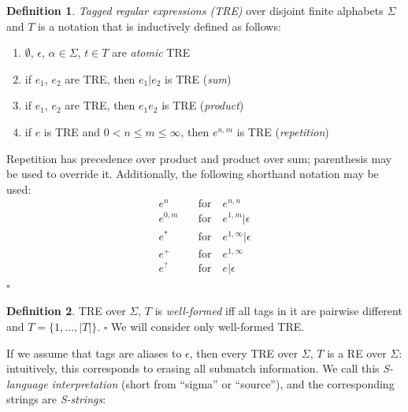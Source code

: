 \documentclass{article}
\newcommand{\Xin}{\!\in\!}
\newcommand{\Xeq}{\!=\!}
\theoremstyle{definition}
\newtheorem{Xdef}{Definition}
\begin{document}
\begin{multicols}{2}
    \begin{Xdef}
    \emph{Tagged regular expressions (TRE)} over disjoint finite alphabets $\Sigma$ and $T$
    is a notation that is inductively defined as follows:
    \begin{enumerate}
        \medskip
        \item[] $\emptyset$, $\epsilon$, $\alpha \Xin \Sigma$, $t \Xin T$ are \emph{atomic} TRE
        \item[] if $e_1$, $e_2$ are TRE, then $e_1 | e_2$ is TRE (\emph{sum})
        \item[] if $e_1$, $e_2$ are TRE, then $e_1 e_2$ is TRE (\emph{product})
        \item[] if $e$ is TRE and $0 \!<\! n \!\leq\! m \!\leq\! \infty$, then $e^{n,m}$ is TRE (\emph{repetition})
        \medskip
    \end{enumerate}
    Repetition has precedence over product and product over sum;
    parenthesis may be used to override it.
    Additionally, the following shorthand notation may be used:
    \begin{align*}
        e^n     &\quad\text{for}\quad e^{n,n} \\[-0.5em]
        e^{0,m} &\quad\text{for}\quad e^{1,m} | \epsilon \\[-0.5em]
        e^*     &\quad\text{for}\quad e^{1,\infty} | \epsilon \\[-0.5em]
        e^+     &\quad\text{for}\quad e^{1,\infty} \\[-0.5em]
        e^?     &\quad\text{for}\quad e | \epsilon
    \end{align*}
    $\square$
    \end{Xdef}

    \begin{Xdef}
    TRE over $\Sigma$, $T$ is \emph{well-formed} iff
    all tags in it are pairwise different
    and $T \Xeq \{ 1, \dots, |T| \}$.
    $\square$
    We will consider only well-formed TRE.
    \end{Xdef}

If we assume that tags are aliases to $\epsilon$, then every TRE over $\Sigma$, $T$ is a RE over $\Sigma$:
intuitively, this corresponds to erasing all submatch information. 
We call this \emph{S-language interpretation} (short from ``sigma'' or ``source''),
and the corresponding strings are \emph{S-strings}:


\end{multicols}
\end{document}
